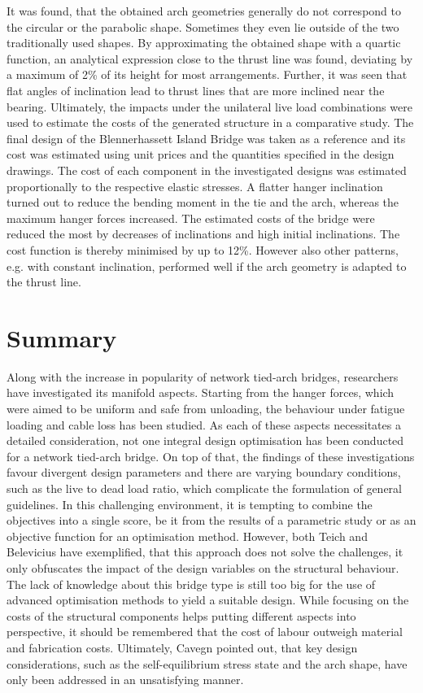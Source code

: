 It was found, that the obtained arch geometries generally do not correspond to the circular or the parabolic shape. Sometimes they even lie outside of the two traditionally used shapes. By approximating the obtained shape with a quartic function, an analytical expression close to the thrust line was found, deviating by a maximum of 2\% of its height for most arrangements. Further, it was seen that flat angles of inclination lead to thrust lines that are more inclined near the bearing. Ultimately, the impacts under the unilateral live load combinations were used to estimate the costs of the generated structure in a comparative study. The final design of the Blennerhassett Island Bridge was taken as a reference and its cost was estimated using unit prices and the quantities specified in the design drawings. The cost of each component in the investigated designs was estimated proportionally to the respective elastic stresses. A flatter hanger inclination turned out to reduce the bending moment in the tie and the arch, whereas the maximum hanger forces increased. The estimated costs of the bridge were reduced the most by decreases of inclinations and high initial inclinations. The cost function is thereby minimised by up to 12\%. However also other patterns, e.g. with constant inclination, performed well if the arch geometry is adapted to the thrust line.


\section{Summary} \label{sec:rev_sum}
Along with the increase in popularity of network tied-arch bridges, researchers have investigated its manifold aspects. Starting from the hanger forces, which were aimed to be uniform and safe from unloading, the behaviour under fatigue loading and cable loss has been studied. As each of these aspects necessitates a detailed consideration, not one integral design optimisation has been conducted for a network tied-arch bridge. On top of that, the findings of these investigations favour divergent design parameters and there are varying boundary conditions, such as the live to dead load ratio, which complicate the formulation of general guidelines. In this challenging environment, it is tempting to combine the objectives into a single score, be it from the results of a parametric study or as an objective function for an optimisation method. However, both Teich and Belevicius have exemplified, that this approach does not solve the challenges, it only obfuscates the impact of the design variables on the structural behaviour. The lack of knowledge about this bridge type is still too big for the use of advanced optimisation methods to yield a suitable design. While focusing on the costs of the structural components helps putting different aspects into perspective, it should be remembered that the cost of labour outweigh material and fabrication costs. Ultimately, Cavegn pointed out, that key design considerations, such as the self-equilibrium stress state and the arch shape, have only been addressed in an unsatisfying manner. 


